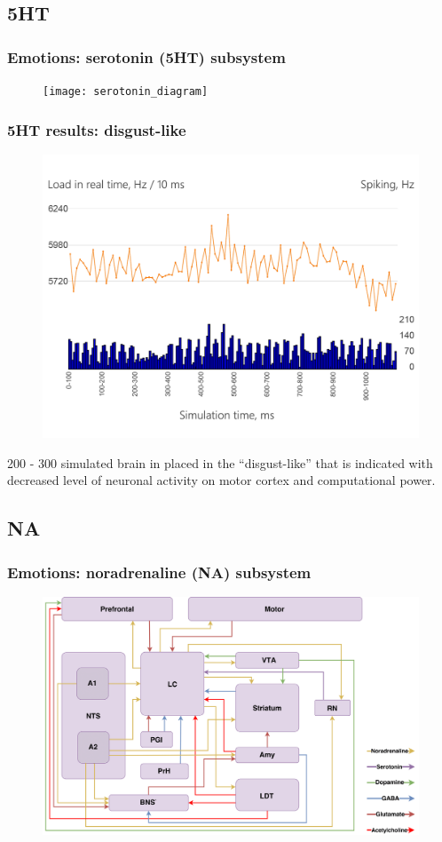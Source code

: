 \documentclass[12pt, aspectratio=169]{beamer}
\begin{document}
\subsection{5HT}

\begin{frame}
\frametitle{Emotions: serotonin (5HT) subsystem}
\begin{figure}
\texttt{[image: serotonin\_diagram]}
\end{figure}
\end{frame}


\begin{frame}
\frametitle{5HT results: disgust-like}
\begin{figure}
\includegraphics[width=0.6\linewidth]{5ht_results}
\end{figure}
200 - 300 simulated brain in placed in the ``disgust-like'' that is indicated with decreased level of neuronal activity on motor cortex and computational power.
\end{frame}

\subsection{NA}

\begin{frame}
\frametitle{Emotions: noradrenaline (NA) subsystem}
\begin{figure}
\includegraphics[width=0.7\linewidth]{na_diagram}
\end{figure}
\end{frame}
\end{document}
